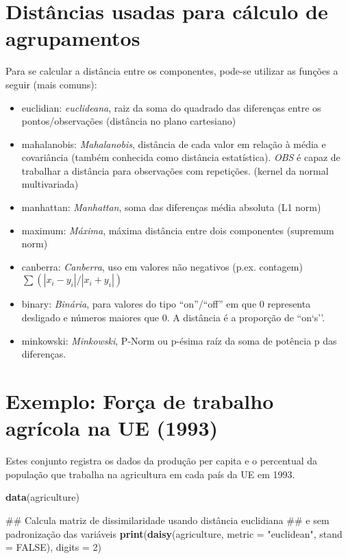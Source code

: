 \documentclass[]{book}
\newenvironment{Shaded}{\begin{snugshade}}{\end{snugshade}}
\newcommand{\KeywordTok}[1]{\textcolor[rgb]{0.13,0.29,0.53}{\textbf{{#1}}}}
\newcommand{\DataTypeTok}[1]{\textcolor[rgb]{0.13,0.29,0.53}{{#1}}}
\newcommand{\DecValTok}[1]{\textcolor[rgb]{0.00,0.00,0.81}{{#1}}}
\newcommand{\StringTok}[1]{\textcolor[rgb]{0.31,0.60,0.02}{{#1}}}
\newcommand{\OtherTok}[1]{\textcolor[rgb]{0.56,0.35,0.01}{{#1}}}
\newcommand{\NormalTok}[1]{{#1}}
\providecommand{\tightlist}{%
  \setlength{\itemsep}{0pt}\setlength{\parskip}{0pt}}
\begin{document}
\section{Distâncias usadas para cálculo de agrupamentos}\label{AAdist}

Para se calcular a distância entre os componentes, pode-se utilizar as
funções a seguir (mais comuns):

\begin{itemize}
\tightlist
\item
  euclidian: \emph{euclideana}, raiz da soma do quadrado das diferenças
  entre os pontos/observações (distância no plano cartesiano)
\item
  mahalanobis: \emph{Mahalanobis}, distância de cada valor em relação à
  média e covariância (também conhecida como distância estatística).
  \emph{OBS} é capaz de trabalhar a distância para observações com
  repetições. (kernel da normal multivariada)
\item
  manhattan: \emph{Manhattan}, soma das diferenças média absoluta (L1
  norm)
\item
  maximum: \emph{Máxima}, máxima distância entre dois componentes
  (supremum norm)
\item
  canberra: \emph{Canberra}, uso em valores não negativos (p.ex.
  contagem) \(\sum(|x_i - y_i| / |x_i + y_i|)\)
\item
  binary: \emph{Binária}, para valores do tipo ``on''/``off'' em que
  \(0\) representa desligado e números maiores que \(0\). A distância é
  a proporção de ``on`s''.
\item
  minkowski: \emph{Minkowski}, P-Norm ou p-ésima raíz da soma de
  potência p das diferenças.
\end{itemize}

\section{Exemplo: Força de trabalho agrícola na UE
(1993)}\label{exemplo-forca-de-trabalho-agricola-na-ue-1993}

Estes conjunto registra os dados da produção per capita e o percentual
da população que trabalha na agricultura em cada país da UE em 1993.

\begin{Shaded}
\begin{Highlighting}[]
\KeywordTok{data}\NormalTok{(agriculture)}

\NormalTok{## Calcula matriz de dissimilaridade usando distância euclidiana }
\NormalTok{## e sem padronização das variáveis}
\KeywordTok{print}\NormalTok{(}\KeywordTok{daisy}\NormalTok{(agriculture, }\DataTypeTok{metric =} \StringTok{"euclidean"}\NormalTok{, }\DataTypeTok{stand =} \OtherTok{FALSE}\NormalTok{),}
      \DataTypeTok{digits =} \DecValTok{2}\NormalTok{)}
\end{Highlighting}
\end{Shaded}
\end{document}
